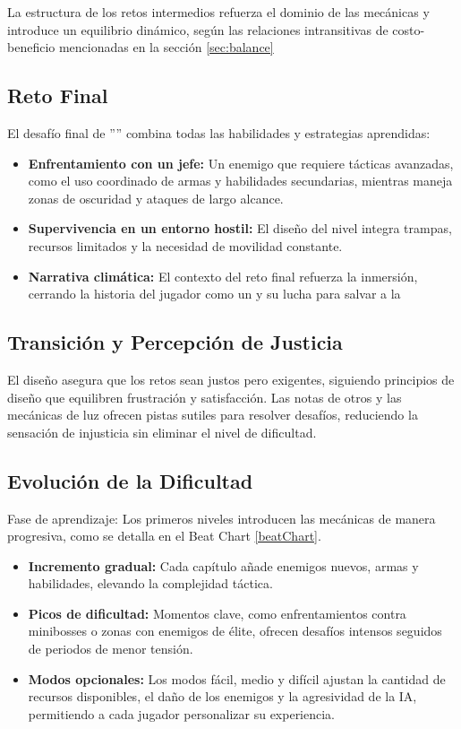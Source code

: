         La estructura de los retos intermedios refuerza el dominio de las mecánicas y introduce un equilibrio dinámico, según las relaciones intransitivas de costo-beneficio mencionadas en la sección \ref{sec:balance}
    \subsection{Reto Final}
        El desafío final de ''\gameTitle'' combina todas las habilidades y estrategias aprendidas:

        \begin{itemize}
            \item \textbf{Enfrentamiento con un jefe:} Un enemigo que requiere tácticas avanzadas, como el uso coordinado de armas y habilidades secundarias, mientras maneja zonas de oscuridad y ataques de largo alcance.

            \item \textbf{Supervivencia en un entorno hostil:} El diseño del nivel integra trampas, recursos limitados y la necesidad de movilidad constante.

            \item \textbf{Narrativa climática:} El contexto del reto final refuerza la inmersión, cerrando la historia del jugador como un \hunter y su lucha para salvar a la \humanity
        \end{itemize}
    \subsection{Transición y Percepción de Justicia}

        El diseño asegura que los retos sean justos pero exigentes, siguiendo principios de diseño que equilibren frustración y satisfacción. Las notas de otros \hunters y las mecánicas de luz ofrecen pistas sutiles para resolver desafíos, reduciendo la sensación de injusticia sin eliminar el nivel de dificultad.

    \subsection{Evolución de la Dificultad}

        Fase de aprendizaje: Los primeros niveles introducen las mecánicas de manera progresiva, como se detalla en el Beat Chart \ref{beatChart}.

        \begin{itemize}
            \item \textbf{Incremento gradual:} Cada capítulo añade enemigos nuevos, armas y habilidades, elevando la complejidad táctica.
            \item \textbf{Picos de dificultad:} Momentos clave, como enfrentamientos contra minibosses o zonas con enemigos de élite, ofrecen desafíos intensos seguidos de periodos de menor tensión.
            \item \textbf{Modos opcionales:} Los modos fácil, medio y difícil ajustan la cantidad de recursos disponibles, el daño de los enemigos y la agresividad de la IA, permitiendo a cada jugador personalizar su experiencia.
        \end{itemize}

